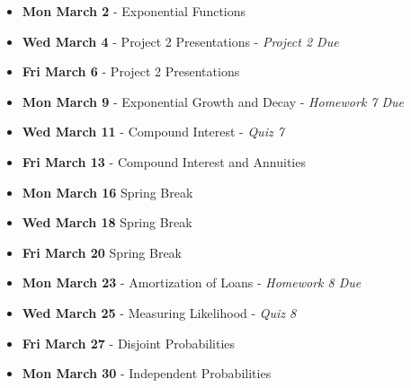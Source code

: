 \begin{itemize}
\item\textbf{Mon March  2}
  - Exponential Functions
\item\textbf{Wed March  4}
  - Project 2 Presentations - {\em Project 2 Due}
\item\textbf{Fri March  6}
  - Project 2 Presentations 
\item\textbf{Mon March  9}
  - Exponential Growth and Decay - {\em Homework 7 Due}
\item\textbf{Wed March 11}
  - Compound Interest  - {\em Quiz 7}
\item\textbf{Fri March 13}
  - Compound Interest and Annuities
\item\textbf{Mon March 16} Spring Break
\item\textbf{Wed March 18} Spring Break
\item\textbf{Fri March 20} Spring Break
\item\textbf{Mon March 23}
  - Amortization of Loans  - {\em Homework 8 Due}
\item\textbf{Wed March 25}
  - Measuring Likelihood - {\em Quiz 8}
\item\textbf{Fri March 27}
  - Disjoint Probabilities
\item\textbf{Mon March 30}
  - Independent Probabilities
\end{itemize}
\hrulefill


